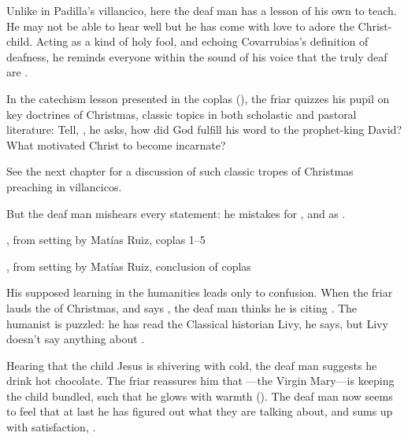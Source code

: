Unlike in Padilla's villancico, here the deaf man has a lesson of his own to 
teach.
He may not be able to hear well but he has come with love to adore the 
Christ-child. 
Acting as a kind of holy fool, and echoing Covarrubias's definition of 
deafness, he reminds everyone within the sound of his voice that the truly deaf 
are .

In the catechism lesson presented in the coplas 
(), the friar quizzes his pupil 
on key doctrines of Christmas, classic topics in both scholastic and pastoral 
literature:
Tell, , he asks, how did God fulfill his word to the prophet-king 
David?
What motivated Christ to become incarnate?%
    \begin{Footnote}
        See the next chapter for a discussion of such classic tropes of 
        Christmas preaching in villancicos.
    \end{Footnote}
But the deaf man mishears every statement: he mistakes  for 
, and  as 
.

\begin{expoem}
    \caption{, 
    from setting by Matías Ruiz, coplas 1--5}
    \label{expoem:Pues_la_fiesta-Ruiz-coplas-1}
\end{expoem}

\begin{expoem}
    \caption{, 
    from setting by Matías Ruiz, conclusion of coplas}
    \label{expoem:Pues_la_fiesta-Ruiz-coplas-2}
\end{expoem}

His supposed learning in the humanities leads only to confusion.
When the friar lauds the  of Christmas, and says 
, the deaf man 
thinks he is citing .
The humanist is puzzled: he has read the Classical historian Livy, he says, but 
Livy doesn't say anything about .

Hearing that the child Jesus is shivering with cold, the deaf man suggests he 
drink hot chocolate.
The friar reassures him that ---the Virgin Mary---is keeping 
the child bundled, such that he glows with warmth ().
The deaf man now seems to feel that at last he has figured out what they are 
talking about, and sums up with satisfaction, .


